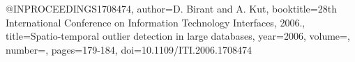 @INPROCEEDINGS{1708474,
  author={D. {Birant} and A. {Kut}},
  booktitle={28th International Conference on Information Technology Interfaces, 2006.}, 
  title={Spatio-temporal outlier detection in large databases}, 
  year={2006},
  volume={},
  number={},
  pages={179-184},
  doi={10.1109/ITI.2006.1708474}}